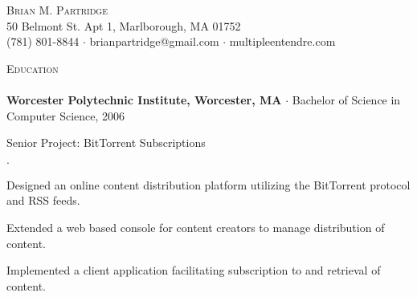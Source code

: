 \documentclass{article}
\newcommand{\mydot}{$\cdot$}
\newcommand{\lineunder}{\vspace*{-8pt} \\ \hspace*{-18pt} \hrulefill \\}
\newcommand{\header}[1]{{\hspace*{-15pt}\vspace*{6pt} \textsc{#1}} \vspace*{-6pt} \lineunder}
\newcommand{\contact}[3]{\vspace*{-8pt}\begin{center}{\LARGE \scshape {#1}}\\#2 \\ #3\end{center}\vspace*{-8pt}}
\newcommand{\school}[2]{ \textbf{#1} $\cdot$ #2 \\}
\newenvironment{courses}{\begin{list}{\mydot}{\topsep 0pt \itemsep -2pt}}{\vspace*{4pt}\end{list}}
\newcommand{\seniorproject}[2]{Senior Project: #1\\ #2  }
\newenvironment{achievements}{\begin{list}{\mydot}{\topsep 0pt \itemsep -2pt}}{\vspace*{4pt}\end{list}}
\begin{document}
\small
\smallskip
\vspace*{-44pt}


\contact{Brian M. Partridge}
{50 Belmont St. Apt 1, Marlborough, MA 01752}
{(781) 801-8844 $\cdot$ brianpartridge@gmail.com $\cdot$ multipleentendre.com}


\header{Education}
\school{Worcester Polytechnic Institute, Worcester, MA}{Bachelor of Science in Computer Science, 2006}

\begin{comment}
Selected Coursework:
\vspace*{-10pt}
\begin{multicols}{3}
\begin{courses}
  \item Operating Systems
  \item Distributed Computer Systems
  \item Software Engineering
  \item Computer Networks
  \item Human-Computer Interaction
  \item Databases
  \item Algorithms
  \item Webware
\end{courses}
\end{multicols}
\vspace*{-12pt}
\end{comment}

\seniorproject{BitTorrent Subscriptions}{
\begin{achievements}
  \item Designed an online content distribution platform utilizing the BitTorrent protocol and RSS feeds.
  \item Extended a web based console for content creators to manage distribution of content.
  \item Implemented a client application facilitating subscription to and retrieval of content.
\end{achievements}
}

\end{document}
